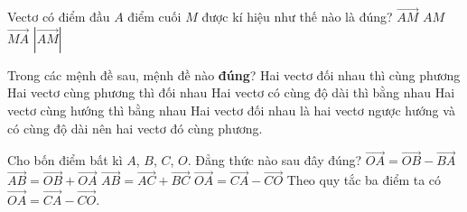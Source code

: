 \begin{ex}%
	Vectơ có điểm đầu $A$ điểm cuối $M$ được kí hiệu như thế nào là đúng?
	\choice
	{\True $\overrightarrow{AM}$}
	{$AM$}
	{$\overrightarrow{MA}$}
	{$\left|\overrightarrow{AM} \right|$}
\end{ex}

\begin{ex}%
	Trong các mệnh đề sau, mệnh đề nào \textbf{đúng}?
	\choice
	{\True Hai vectơ đối nhau thì cùng phương}
	{Hai vectơ cùng phương thì đối nhau}
	{Hai vectơ có cùng độ dài thì bằng nhau}
	{Hai vectơ cùng hướng thì bằng nhau}
	\loigiai
	{Hai vectơ đối nhau là hai vectơ ngược hướng và có cùng độ dài nên hai vectơ đó cùng phương.}
\end{ex}

\begin{ex}%
	Cho bốn điểm bất kì $A$, $B$, $C$, $O$. Đẳng thức nào sau đây đúng?
	\choice
	{$\overrightarrow{OA}= \overrightarrow{OB}-\overrightarrow{BA}$}
	{$\overrightarrow{AB}= \overrightarrow{OB}+\overrightarrow{OA}$}
	{$\overrightarrow{AB}= \overrightarrow{AC}+\overrightarrow{BC}$}
	{\True $\overrightarrow{OA}= \overrightarrow{CA}-\overrightarrow{CO}$}
	\loigiai
	{
		Theo quy tắc ba điểm ta có $\overrightarrow{OA}= \overrightarrow{CA}-\overrightarrow{CO}$.
	}
\end{ex}

